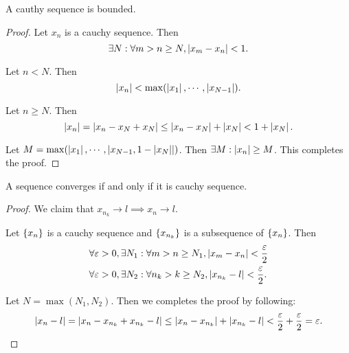 \begin{theorem}
  A cauthy sequence is bounded.
  \label{thm:cauchy_bound}
\end{theorem}

\begin{proof}
  Let $x_n$ is a cauchy sequence. Then
  \begin{equation}
    \exists N: \forall m > n \ge N, \left| x_m - x_n \right| < 1.
  \end{equation}

  Let $n < N$. Then
  \begin{equation}
    \left| x_n \right| < \max (\left| x_1 \right|, \cdots, \left| x_{N-1} \right|).
  \end{equation}

  Let $n \ge N$. Then
  \begin{equation}
    \left| x_n \right| 
    =   \left| x_n - x_N + x_N \right| 
    \le \left| x_n - x_N \right| + \left| x_N \right|
    <   1 + \left| x_N \right|.
  \end{equation}

  Let $M = \max (\left| x_1 \right|, \cdots, \left| x_{N-1}, 1 - \left| x_N \right| \right|)$. Then
  $\exists M: \left| x_n \right| \ge M$. This completes the proof.
\end{proof}

\begin{theorem} 
  A sequence converges if and only if it is cauchy sequence.
  \label{thm:cauchy_test}
\end{theorem}

\begin{proof}

  We claim that $x_{n_k} \to l \implies x_n \to l$. 
  
  Let $\{x_n\}$ is a cauchy sequence and $\{x_{n_k}\}$ is a subsequence of
  $\{x_n\}$. Then
  \begin{equation}
    \begin{split}
      &\forall \varepsilon > 0, \exists N_1: \forall m > n \ge N_1, \left| x_m - x_n \right| 
      < \frac{\varepsilon}{2} \\
      &\forall \varepsilon > 0, \exists N_2: \forall n_k > k \ge N_2, \left| x_{n_k} - l \right| 
      < \frac{\varepsilon}{2}.
    \end{split}
  \end{equation}

  Let $N = \max (N_1, N_2)$. Then we completes the proof by following:
  \begin{equation}
    \left| x_n - l \right| 
    =   \left| x_n - x_{n_k} + x_{n_k} - l \right|
    \le \left| x_n - x_{n_k} \right| + \left| x_{n_k} - l \right|
    <   \frac{\varepsilon}{2} + \frac{\varepsilon}{2}
    =   \varepsilon.
  \end{equation}
\end{proof}

